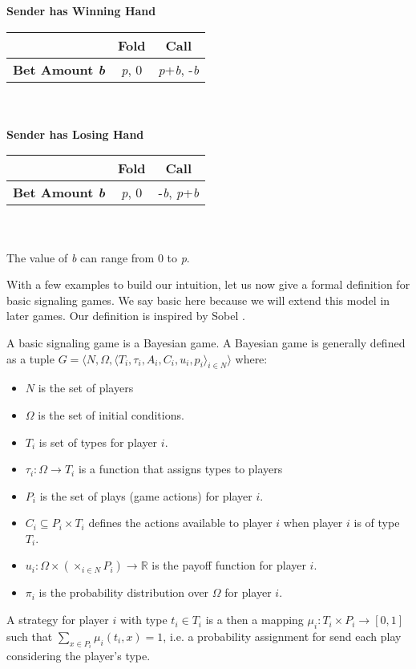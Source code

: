 \documentclass{article}
\begin{document}
\textbf{Sender has Winning Hand}\\
\begin{tabular}{c | c | c} & \textbf{Fold} & \textbf{Call} \\ \hline \textbf{Bet Amount \emph{b}} & \emph{p}, 0 & \emph{p}+\emph{b}, -\emph{b} \end{tabular}
\\ \\

\textbf{Sender has Losing Hand}\\
\begin{tabular}{c | c | c} & \textbf{Fold} & \textbf{Call} \\ \hline \textbf{Bet Amount \emph{b}} & \emph{p}, 0 &  -\emph{b}, \emph{p}+\emph{b} \end{tabular}
\\ \\
The value of \emph{b} can range from 0 to \emph{p}.

With a few examples to build our intuition, let us now give a formal definition for basic signaling games. We say basic here because we will extend this model in later games. Our definition is inspired by Sobel \cite{sobel1}.

A basic signaling game is a Bayesian game. A Bayesian game is generally defined as a tuple $ G = \langle N, \Omega, \langle T_{i}, \tau_{i}, A_{i}, C_{i}, u_{i}, p_{i} \rangle _{i \in N} \rangle $ where:

\begin{itemize}
\item $N$ is the set of players
\item $\Omega$ is the set of initial conditions.
\item $T_{i}$ is set of types for player $i$.
\item $\tau_{i}:\Omega \to T_{i}$ is a function that assigns types to players
\item $P_{i}$ is the set of plays (game actions) for player $i$.
\item $C_{i} \subseteq P_{i} \times T_{i}$ defines the actions available to player $i$ when player $i$ is of type $T_{i}$. 
\item $u_i:\Omega \times (\times_{i \in N} P_{i}) \to \mathbb{R}$ is the payoff function for player $i$.
\item $\pi_{i}$ is the probability distribution over $\Omega$ for player $i$.
\end{itemize}

\noindent A strategy for player $i$ with type $t_{i} \in T_{i}$ is a then a mapping $\mu_i: T_i \times P_i \to [0,1]$ such that $\sum_{x \in P_i} \mu_i(t_i, x) = 1$, i.e. a probability assignment for send each play considering the player's type.\\
\end{document}
